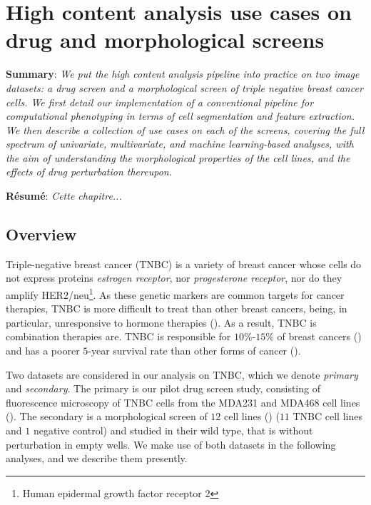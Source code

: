 
\chapter{High content analysis use cases on drug and morphological screens} %
\label{Chapter2} %


\textbf{Summary}: \emph{We put the high content analysis pipeline into practice on two image datasets: a drug screen and a morphological screen of triple negative breast cancer cells. We first detail our implementation of a conventional pipeline for computational phenotyping in terms of cell segmentation and feature extraction. We then describe a collection of use cases on each of the screens, covering the full spectrum of univariate, multivariate, and machine learning-based analyses, with the aim of understanding the morphological properties of the cell lines, and the effects of drug perturbation thereupon.}

\textbf{R\'esum\'e}: \emph{Cette chapitre...}

\section{Overview}

Triple-negative breast cancer (TNBC) is a variety of breast cancer whose cells do not express proteins \emph{estrogen receptor}, nor \emph{progesterone receptor}, nor do they amplify HER2/neu\footnote{Human epidermal growth factor receptor 2}. As these genetic markers are common targets for cancer therapies, TNBC is more difficult to treat than other breast cancers, being, in particular, unresponsive to hormone therapies (\cite{hudis2011triple}). As a result, TNBC is combination therapies are. TNBC is responsible for $10\%$-$15\%$ of breast cancers (\cite{chavez2010triple}) and has a poorer $5$-year survival rate than other forms of cancer (\cite{gonccalves2018survival}).

Two datasets are considered in our analysis on TNBC, which we denote \emph{primary} and \emph{secondary}. The primary is our pilot drug screen study, consisting of fluorescence microscopy of TNBC cells from the MDA231 and MDA468 cell lines (\cite{filmus1985mda}). The secondary is a morphological screen of $12$ cell lines (\cite{chavez2010triple}) ($11$ TNBC cell lines and $1$ negative control) and studied in their wild type, that is without perturbation in empty wells. We make use of both datasets in the following analyses, and we describe them presently.

